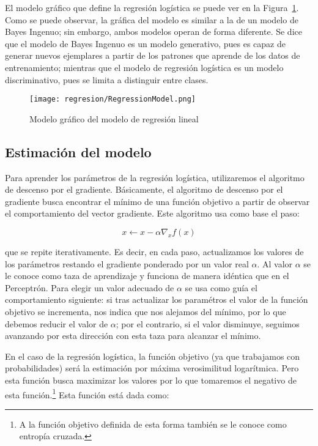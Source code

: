 El modelo gráfico que define la regresión logística se puede ver en la Figura~\ref{Fig:LinearReg}. Como se puede observar, la gráfica del modelo es similar a la de un modelo de Bayes Ingenuo; sin embargo, ambos modelos operan de forma diferente. Se dice que el modelo de Bayes Ingenuo es un modelo generativo, pues es capaz de generar nuevos ejemplares a partir de los patrones que aprende de los datos de entrenamiento; mientras que el modelo de regresión logística es un modelo discriminativo, pues se limita a distinguir entre clases.

\begin{figure}
 \centering
 \texttt{[image: regresion/RegressionModel.png]}
 \caption{Modelo gráfico del modelo de regresión lineal}\label{Fig:LinearReg}
\end{figure}    




\subsection{Estimación del modelo}

Para aprender los parámetros de la regresión logística, utilizaremos el algoritmo de descenso por el gradiente. Básicamente, el algoritmo de descenso por el gradiente busca encontrar el mínimo de una función objetivo a partir de observar el comportamiento del vector gradiente. Este algoritmo usa como base el paso:

$$ x \leftarrow x - \alpha \nabla_x f(x) $$

que se repite iterativamente.  Es decir, en cada paso, actualizamos los valores de los parámetros restando el gradiente ponderado por un valor real $\alpha$. Al valor $\alpha$ se le conoce como taza de aprendizaje y funciona de manera idéntica que en el Perceptrón.  Para elegir un valor adecuado de $\alpha$ se usa como guía el comportamiento siguiente: si tras actualizar los paramétros el valor de la función objetivo se incrementa, nos indica que nos alejamos del mínimo, por lo que debemos reducir el valor de $\alpha$; por el contrario, si el valor disminuye, seguimos avanzando por esta dirección con esta taza para alcanzar el mínimo.

En el caso de la regresión logística, la función objetivo (ya que trabajamos con probabilidades) será la estimación por máxima verosimilitud logarítmica. Pero esta función busca maximizar los valores por lo que tomaremos el negativo de esta función.\footnote{A la función objetivo definida de esta forma también se le conoce como entropía cruzada.} Esta función está dada como:

